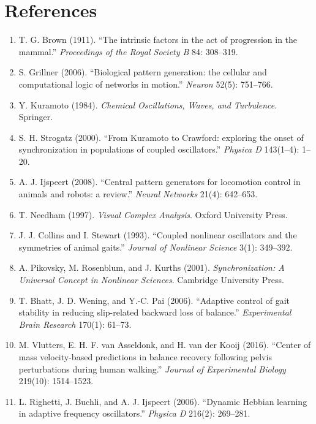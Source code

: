\documentclass[12pt]{article}
\begin{document}
\section*{References}
\begin{enumerate}
\item T. G. Brown (1911). ``The intrinsic factors in the act of progression in the mammal.'' \emph{Proceedings of the Royal Society B} 84: 308--319.
\item S. Grillner (2006). ``Biological pattern generation: the cellular and computational logic of networks in motion.'' \emph{Neuron} 52(5): 751--766.
\item Y. Kuramoto (1984). \emph{Chemical Oscillations, Waves, and Turbulence}. Springer.
\item S. H. Strogatz (2000). ``From Kuramoto to Crawford: exploring the onset of synchronization in populations of coupled oscillators.'' \emph{Physica D} 143(1--4): 1--20.
\item A. J. Ijspeert (2008). ``Central pattern generators for locomotion control in animals and robots: a review.'' \emph{Neural Networks} 21(4): 642--653.
\item T. Needham (1997). \emph{Visual Complex Analysis}. Oxford University Press.
\item J. J. Collins and I. Stewart (1993). ``Coupled nonlinear oscillators and the symmetries of animal gaits.'' \emph{Journal of Nonlinear Science} 3(1): 349--392.
\item A. Pikovsky, M. Rosenblum, and J. Kurths (2001). \emph{Synchronization: A Universal Concept in Nonlinear Sciences}. Cambridge University Press.
\item T. Bhatt, J. D. Wening, and Y.-C. Pai (2006). ``Adaptive control of gait stability in reducing slip-related backward loss of balance.'' \emph{Experimental Brain Research} 170(1): 61--73.
\item M. Vlutters, E. H. F. van Asseldonk, and H. van der Kooij (2016). ``Center of mass velocity-based predictions in balance recovery following pelvis perturbations during human walking.'' \emph{Journal of Experimental Biology} 219(10): 1514--1523.
\item L. Righetti, J. Buchli, and A. J. Ijspeert (2006). ``Dynamic Hebbian learning in adaptive frequency oscillators.'' \emph{Physica D} 216(2): 269--281.
\end{enumerate}
\end{document}
